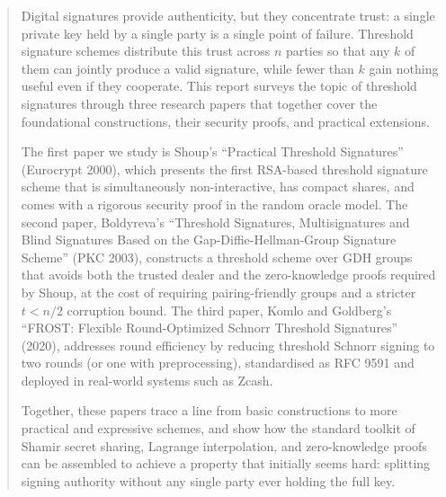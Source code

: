 \begin{abstract}
\noindent
Digital signatures provide authenticity, but they concentrate trust: a single private key
held by a single party is a single point of failure. Threshold signature schemes
distribute this trust across $n$ parties so that any $k$ of them can jointly produce a
valid signature, while fewer than $k$ gain nothing useful even if they cooperate. This
report surveys the topic of threshold signatures through three research papers that
together cover the foundational constructions, their security proofs, and practical
extensions.

The first paper we study is Shoup's ``Practical Threshold Signatures'' (Eurocrypt 2000),
which presents the first RSA-based threshold signature scheme that is simultaneously
non-interactive, has compact shares, and comes with a rigorous security proof in the
random oracle model. The second paper, Boldyreva's ``Threshold Signatures, Multisignatures and Blind
Signatures Based on the Gap-Diffie-Hellman-Group Signature Scheme'' (PKC 2003),
constructs a threshold scheme over GDH groups that avoids both the trusted dealer and
the zero-knowledge proofs required by Shoup, at the cost of requiring pairing-friendly
groups and a stricter $t < n/2$ corruption bound.
The third paper, Komlo and Goldberg's ``FROST: Flexible Round-Optimized Schnorr Threshold
Signatures'' (2020), addresses round efficiency by reducing threshold Schnorr signing to
two rounds (or one with preprocessing), standardised as RFC 9591 and deployed in
real-world systems such as Zcash.

Together, these papers trace a line from basic constructions to more practical and
expressive schemes, and show how the standard toolkit of Shamir secret sharing, Lagrange
interpolation, and zero-knowledge proofs can be assembled to achieve a property that
initially seems hard: splitting signing authority without any single party ever holding
the full key.
\end{abstract}
